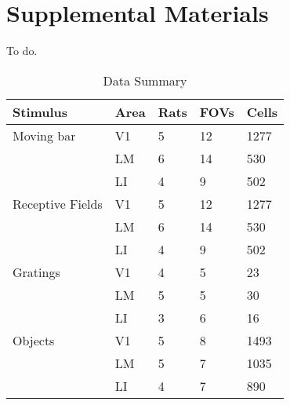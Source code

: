 \chapter{Supplemental Materials}
\label{supplementals}

To do.

\begin{table}[h]
 \caption{Data Summary}
  \centering
   \begin{tabular}{lllll}
    \toprule
    Stimulus & Area & Rats & FOVs & Cells   \\
    \midrule
    Moving bar & V1  & 5 & 12 & 1277        \\
               & LM  & 6 & 14 & 530         \\
               & LI  & 4 & 9 & 502          \\
    \midrule
    Receptive Fields & V1  & 5 & 12 & 1277  \\
                     & LM  & 6 & 14 & 530   \\
                     & LI  & 4 & 9 & 502    \\
    \midrule
    Gratings & V1  & 4 & 5 & 23     \\
             & LM  & 5 & 5 & 30     \\
             & LI  & 3 & 6 & 16     \\
    \midrule
    Objects  & V1  & 5 & 8 & 1493   \\
             & LM  & 5 & 7 & 1035   \\
             & LI  & 4 & 7 & 890    \\
    \bottomrule
  \end{tabular}
  \label{tab:data_counts}
\end{table}







